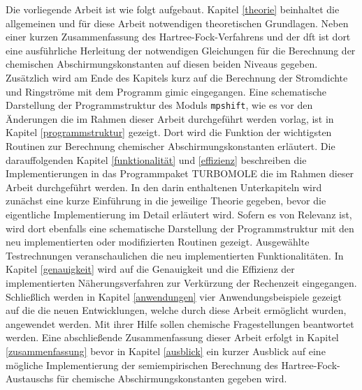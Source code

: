 \bigskip
Die vorliegende Arbeit ist wie folgt aufgebaut. Kapitel \ref{theorie} beinhaltet die allgemeinen und für diese Arbeit notwendigen theoretischen Grundlagen. Neben einer kurzen Zusammenfassung des Hartree-Fock-Verfahrens und der \ac{dft} ist dort eine ausführliche Herleitung der notwendigen Gleichungen für die Berechnung der chemischen Abschirmungskonstanten auf diesen beiden Niveaus gegeben. Zusätzlich wird am Ende des Kapitels kurz auf die Berechnung der Stromdichte und Ringströme mit dem Programm \ac{gimic} eingegangen. Eine schematische Darstellung der Programmstruktur des Moduls \texttt{mpshift}, wie es vor den Änderungen die im Rahmen dieser Arbeit durchgeführt werden vorlag, ist in Kapitel \ref{programmstruktur} gezeigt. Dort wird die Funktion der wichtigsten Routinen zur Berechnung chemischer Abschirmungskonstanten erläutert. Die darauffolgenden Kapitel \ref{funktionalität} und \ref{effizienz} beschreiben die Implementierungen in das Programmpaket \textsc{TURBOMOLE} die im Rahmen dieser Arbeit durchgeführt werden. In den darin enthaltenen Unterkapiteln wird zunächst eine kurze Einführung in die jeweilige Theorie gegeben, bevor die eigentliche Implementierung im Detail erläutert wird. Sofern es von Relevanz ist, wird dort ebenfalls eine schematische Darstellung der Programmstruktur mit den neu implementierten oder modifizierten Routinen gezeigt. Ausgewählte Testrechnungen veranschaulichen die neu implementierten Funktionalitäten. In Kapitel \ref{genauigkeit} wird auf die Genauigkeit und die Effizienz der implementierten Näherungsverfahren zur Verkürzung der Rechenzeit eingegangen. Schließlich werden in Kapitel \ref{anwendungen} vier Anwendungsbeispiele gezeigt auf die die neuen Entwicklungen, welche durch diese Arbeit ermöglicht wurden, angewendet werden. Mit ihrer Hilfe sollen chemische Fragestellungen beantwortet werden. Eine abschließende Zusammenfassung dieser Arbeit erfolgt in Kapitel \ref{zusammenfassung} bevor in Kapitel \ref{ausblick} ein kurzer Ausblick auf eine mögliche Implementierung der semiempirischen Berechnung des Hartree-Fock-Austauschs für chemische Abschirmungskonstanten gegeben wird.